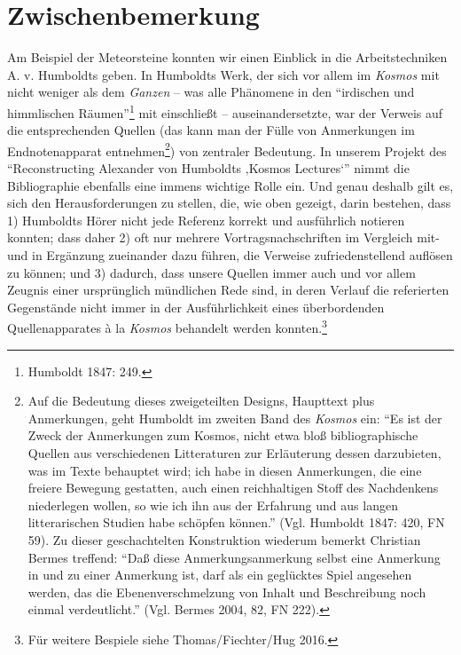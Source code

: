 \documentclass[output=paper]{langsci/langscibook}
\begin{document}
\section*{Zwischenbemerkung}\label{zwischenbemerkung}

Am Beispiel der Meteorsteine konnten wir einen Einblick in die
Arbeitstechniken A. v. Humboldts geben. In Humboldts Werk, der sich vor
allem im \emph{Kosmos} mit nicht weniger als dem \emph{Ganzen} -- was
alle Phänomene in den \enquote{irdischen und himmlischen
Räumen}\footnote{Humboldt 1847: 249.} mit einschließt --
auseinandersetzte, war der Verweis auf die entsprechenden Quellen (das
kann man der Fülle von Anmerkungen im Endnotenapparat
entnehmen\footnote{Auf die Bedeutung dieses zweigeteilten Designs,
  Haupttext plus Anmerkungen, geht Humboldt im zweiten Band des
  \emph{Kosmos} ein: \enquote{Es ist der Zweck der Anmerkungen zum
  Kosmos, nicht etwa bloß bibliographische Quellen aus verschiedenen
  Litteraturen zur Erläuterung dessen darzubieten, was im Texte
  behauptet wird; ich habe in diesen Anmerkungen, die eine freiere
  Bewegung gestatten, auch einen reichhaltigen Stoff des Nachdenkens
  niederlegen wollen, so wie ich ihn aus der Erfahrung und aus langen
  litterarischen Studien habe schöpfen können.} (Vgl. Humboldt 1847:
  420, FN 59). Zu dieser geschachtelten Konstruktion wiederum bemerkt
  Christian Bermes treffend: \enquote{Daß diese Anmerkungsanmerkung
  selbst eine Anmerkung in und zu einer Anmerkung ist, darf als ein
  geglücktes Spiel angesehen werden, das die Ebenenverschmelzung von
  Inhalt und Beschreibung noch einmal verdeutlicht.} (Vgl. Bermes 2004,
  82, FN 222).}) von zentraler Bedeutung. In unserem Projekt des
\enquote{Reconstructing Alexander von Humboldts ‚Kosmos Lectures`} nimmt
die Bibliographie ebenfalls eine immens wichtige Rolle ein. Und genau
deshalb gilt es, sich den Herausforderungen zu stellen, die, wie oben
gezeigt, darin bestehen, dass 1) Humboldts Hörer nicht jede Referenz
korrekt und ausführlich notieren konnten; dass daher 2) oft nur mehrere
Vortragsnachschriften im Vergleich mit- und in Ergänzung zueinander dazu
führen, die Verweise zufriedenstellend auflösen zu können; und 3)
dadurch, dass unsere Quellen immer auch und vor allem Zeugnis einer
ursprünglich mündlichen Rede sind, in deren Verlauf die referierten
Gegenstände nicht immer in der Ausführlichkeit eines überbordenden
Quellenapparates à la \emph{Kosmos} behandelt werden konnten.\footnote{Für
  weitere Bespiele siehe Thomas/Fiechter/Hug 2016.}
\end{document}
